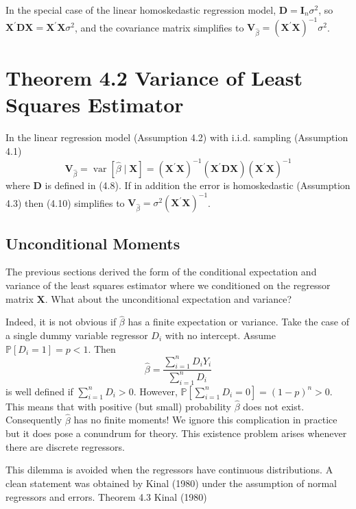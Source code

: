 \documentclass[10pt]{article}
\begin{document}
In the special case of the linear homoskedastic regression model, $\boldsymbol{D}=\boldsymbol{I}_{n} \sigma^{2}$, so $\boldsymbol{X}^{\prime} \boldsymbol{D} \boldsymbol{X}=\boldsymbol{X}^{\prime} \boldsymbol{X} \sigma^{2}$, and the covariance matrix simplifies to $\boldsymbol{V}_{\widehat{\beta}}=\left(\boldsymbol{X}^{\prime} \boldsymbol{X}\right)^{-1} \sigma^{2}$.

\section{Theorem 4.2 Variance of Least Squares Estimator}
In the linear regression model (Assumption 4.2) with i.i.d. sampling (Assumption 4.1)
$$
\boldsymbol{V}_{\widehat{\beta}}=\operatorname{var}[\widehat{\beta} \mid \boldsymbol{X}]=\left(\boldsymbol{X}^{\prime} \boldsymbol{X}\right)^{-1}\left(\boldsymbol{X}^{\prime} \boldsymbol{D} \boldsymbol{X}\right)\left(\boldsymbol{X}^{\prime} \boldsymbol{X}\right)^{-1}
$$
where $\boldsymbol{D}$ is defined in (4.8). If in addition the error is homoskedastic (Assumption 4.3) then (4.10) simplifies to $\boldsymbol{V}_{\widehat{\beta}}=\sigma^{2}\left(\boldsymbol{X}^{\prime} \boldsymbol{X}\right)^{-1}$.

\subsection{Unconditional Moments}
The previous sections derived the form of the conditional expectation and variance of the least squares estimator where we conditioned on the regressor matrix $\boldsymbol{X}$. What about the unconditional expectation and variance?

Indeed, it is not obvious if $\widehat{\beta}$ has a finite expectation or variance. Take the case of a single dummy variable regressor $D_{i}$ with no intercept. Assume $\mathbb{P}\left[D_{i}=1\right]=p<1$. Then
$$
\widehat{\beta}=\frac{\sum_{i=1}^{n} D_{i} Y_{i}}{\sum_{i=1}^{n} D_{i}}
$$
is well defined if $\sum_{i=1}^{n} D_{i}>0$. However, $\mathbb{P}\left[\sum_{i=1}^{n} D_{i}=0\right]=(1-p)^{n}>0$. This means that with positive (but small) probability $\widehat{\beta}$ does not exist. Consequently $\widehat{\beta}$ has no finite moments! We ignore this complication in practice but it does pose a conundrum for theory. This existence problem arises whenever there are discrete regressors.

This dilemma is avoided when the regressors have continuous distributions. A clean statement was obtained by Kinal (1980) under the assumption of normal regressors and errors. Theorem 4.3 Kinal (1980)
\end{document}
